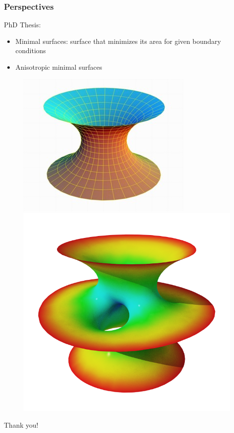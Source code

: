 \documentclass{beamer}
\begin{document}
\begin{frame}
    \frametitle{Perspectives}

    PhD Thesis:
    \begin{itemize}
        \item Minimal surfaces: surface that minimizes its area for given
            boundary conditions
        \item Anisotropic minimal surfaces
    \end{itemize}

    \begin{figure}
        \centering
        \includegraphics[scale=0.35]{img/catenoid}
        \includegraphics[scale=0.15]{img/costa-minimal}
    \end{figure}
\end{frame}

\begin{frame}
    \begin{center}
        \huge{Thank you!}
    \end{center}
\end{frame}
\end{document}
